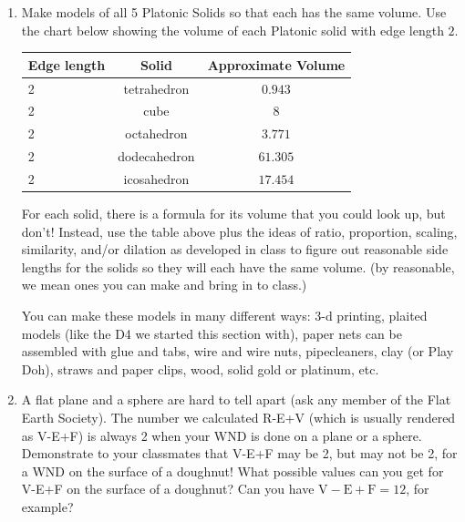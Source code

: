 \begin{enumerate}
\item Make models of all 5 Platonic Solids so that each has the same volume. Use the chart below showing the volume of each Platonic solid with edge length $2$. 

\begin{tabular}{| l | c| c|}
\hline
Edge length & Solid & Approximate Volume\\
\hline
2 & tetrahedron & $0.943$\\
\hline
2 & cube & $8$\\
\hline
2 & octahedron & $ 3.771$\\
\hline
2 & dodecahedron & $ 61.305$\\
\hline
2 & icosahedron & $17.454$\\
\hline
\end{tabular}

For each solid, there is a formula for its volume that you could look up, but don't! Instead, use the table above plus the ideas of ratio, proportion, scaling, similarity, and/or dilation as developed in class to figure out reasonable side lengths for the solids so they will each have the same volume. (by reasonable, we mean ones you can make and bring in to class.)

 You can make these models in many different ways:  3-d printing, plaited models (like the D4 we started this section with), paper nets can be assembled with glue and tabs, wire and wire nuts, pipecleaners, clay (or Play Doh), straws and paper clips, wood, solid gold or platinum, etc.



\iffalse  
\item A flat plane and a sphere are hard to tell apart (ask any member of the Flat Earth Society).  The number we calculated R-E+V (which is usually rendered as V-E+F) is always 2 when your WND is done on a plane or a sphere.  Demonstrate to your classmates that V-E+F may be 2, but may not be 2, for a WND on the surface of a doughnut!  What possible values can you get for V-E+F on the surface of a doughnut? Can you have $\text{V}-\text{E}+\text{F}=12$, for example?




\end{enumerate}
